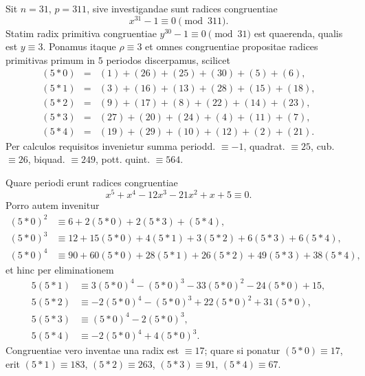 \documentclass[12pt]{article}
\begin{document}
Sit $n=31$, $p=311$, sive investigandae sunt radices congruentiae
\[
x^{31}-1\equiv 0\pmod {311}.
\]
Statim radix primitiva congruentiae $y^{30}-1\equiv 0\pmod {31}$ est quaerenda, qualis est $y\equiv 3$. Ponamus itaque $\rho\equiv 3$ et omnes congruentiae propositae radices primitivas primum in $5$ periodos discerpamus, scilicet
\[
\begin{array}{rcl}
(5*0)&=&(1)+(26)+(25)+(30)+(5)+(6),\\
(5*1)&=&(3)+(16)+(13)+(28)+(15)+(18),\\
(5*2)&=&(9)+(17)+(8)+(22)+(14)+(23),\\
(5*3)&=&(27)+(20)+(24)+(4)+(11)+(7),\\
(5*4)&=&(19)+(29)+(10)+(12)+(2)+(21).
\end{array}
\]
Per calculos requisitos invenietur summa periodd. $\equiv -1$, quadrat. $\equiv 25$, cub. $\equiv 26$, biquad. $\equiv 249$, pott. quint. $\equiv 564$.

Quare periodi erunt radices congruentiae
\[
x^5+x^4-12x^3-21x^2+x+5\equiv 0.
\]
Porro autem invenitur
\[
\begin{aligned}
(5*0)^2&\equiv 6+2(5*0)+2(5*3)+(5*4),\\
(5*0)^3&\equiv 12+15(5*0)+4(5*1)+3(5*2)+6(5*3)+6(5*4),\\
(5*0)^4&\equiv 90+60(5*0)+28(5*1)+26(5*2)+49(5*3)+38(5*4),
\end{aligned}
\]
et hinc per eliminationem
\[
\begin{aligned}
5(5*1)&\equiv 3(5*0)^4-(5*0)^3-33(5*0)^2-24(5*0)+15,\\
5(5*2)&\equiv -2(5*0)^4-(5*0)^3+22(5*0)^2+31(5*0),\\
5(5*3)&\equiv (5*0)^4-2(5*0)^3,\\
5(5*4)&\equiv -2(5*0)^4+4(5*0)^3.
\end{aligned}
\]
Congruentiae vero inventae una radix est $\equiv 17$; quare si ponatur $(5*0)\equiv 17$, erit $(5*1)\equiv 183$, $(5*2)\equiv 263$, $(5*3)\equiv 91$, $(5*4)\equiv 67$.
\end{document}
